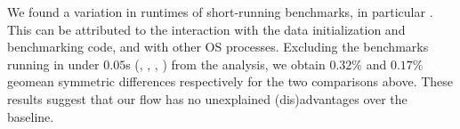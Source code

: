 We found a variation in runtimes of short-running benchmarks, in particular . This can be attributed to the interaction with the data initialization and benchmarking code, and with other OS processes. Excluding the benchmarks running in under $0.05$s (, , , ) from the analysis, we obtain $0.32\%$ and $0.17\%$ geomean symmetric differences respectively for the two comparisons above. These results suggest that our flow has no unexplained (dis)advantages over the baseline.




